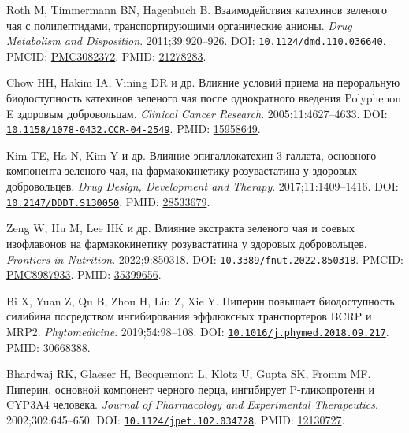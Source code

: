 \documentclass[11pt]{article}
\begin{document}
\begin{description}[before={\microtypesetup{expansion=false}\setlength{\RaggedRightRightskip}{0pt plus 4em}\RaggedRight}]
\item[{[79]}] Roth M, Timmermann BN, Hagenbuch B. Взаимодействия катехинов зеленого чая с полипептидами, транспортирующими органические анионы. \textit{\foreignlanguage{english}{Drug Metabolism and Disposition}}. 2011;39:920--926. DOI: \href{https://doi.org/10.1124/dmd.110.036640}{\nolinkurl{10.1124/dmd.110.036640}}. PMCID: \href{https://pmc.ncbi.nlm.nih.gov/articles/PMC3082372/}{PMC3082372}. PMID: \href{https://pubmed.ncbi.nlm.nih.gov/21278283/}{21278283}.
\item[{[80]}] Chow HH, Hakim IA, Vining DR и др. Влияние условий приема на пероральную биодоступность катехинов зеленого чая после однократного введения Polyphenon E здоровым добровольцам. \textit{\foreignlanguage{english}{Clinical Cancer Research}}. 2005;11:4627--4633. DOI: \href{https://doi.org/10.1158/1078-0432.CCR-04-2549}{\nolinkurl{10.1158/1078-0432.CCR-04-2549}}. PMID: \href{https://pubmed.ncbi.nlm.nih.gov/15958649/}{15958649}.
\item[{[81]}] Kim TE, Ha N, Kim Y и др. Влияние эпигаллокатехин-3-галлата, основного компонента зеленого чая, на фармакокинетику розувастатина у здоровых добровольцев. \textit{\foreignlanguage{english}{Drug Design, Development and Therapy}}. 2017;11:1409--1416. DOI: \href{https://doi.org/10.2147/DDDT.S130050}{\nolinkurl{10.2147/DDDT.S130050}}. PMID: \href{https://pubmed.ncbi.nlm.nih.gov/28533679/}{28533679}.
\item[{[82]}] Zeng W, Hu M, Lee HK и др. Влияние экстракта зеленого чая и соевых изофлавонов на фармакокинетику розувастатина у здоровых добровольцев. \textit{\foreignlanguage{english}{Frontiers in Nutrition}}. 2022;9:850318. DOI: \href{https://doi.org/10.3389/fnut.2022.850318}{\nolinkurl{10.3389/fnut.2022.850318}}. PMCID: \href{https://pmc.ncbi.nlm.nih.gov/articles/PMC8987933/}{PMC8987933}. PMID: \href{https://pubmed.ncbi.nlm.nih.gov/35399656/}{35399656}.
\item[{[83]}] Bi X, Yuan Z, Qu B, Zhou H, Liu Z, Xie Y. Пиперин повышает биодоступность силибина посредством ингибирования эффлюксных транспортеров BCRP и MRP2. \textit{\foreignlanguage{english}{Phytomedicine}}. 2019;54:98--108. DOI: \href{https://doi.org/10.1016/j.phymed.2018.09.217}{\nolinkurl{10.1016/j.phymed.2018.09.217}}. PMID: \href{https://pubmed.ncbi.nlm.nih.gov/30668388/}{30668388}.
\item[{[84]}] Bhardwaj RK, Glaeser H, Becquemont L, Klotz U, Gupta SK, Fromm MF. Пиперин, основной компонент черного перца, ингибирует P-гликопротеин и CYP3A4 человека. \textit{\foreignlanguage{english}{Journal of Pharmacology and Experimental Therapeutics}}. 2002;302:645--650. DOI: \href{https://doi.org/10.1124/jpet.102.034728}{\nolinkurl{10.1124/jpet.102.034728}}. PMID: \href{https://pubmed.ncbi.nlm.nih.gov/12130727/}{12130727}.

\end{description}
\end{document}
